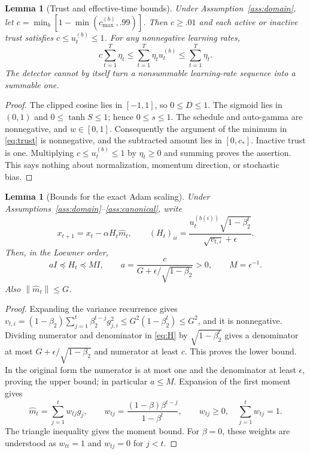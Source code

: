 \documentclass[11pt,a4paper]{article}
\newtheorem{lemma}[theorem]{Lemma}
\theoremstyle{definition}
\theoremstyle{remark}
\newcommand{\norm}[1]{\left\lVert#1\right\rVert}
\begin{document}
\begin{lemma}[Trust and effective-time bounds]\label{lem:trust}
Under Assumption~\ref{ass:domain}, let
$c=\min_b[1-\min(c_{\max}^{(b)},.99)]$. Then $c\ge.01$ and each active
or inactive trust satisfies $c\le u_t^{(b)}\le1$. For any nonnegative
learning rates,
\[
 c\sum_{t=1}^T\eta_t\le\sum_{t=1}^T\eta_t u_t^{(b)}\le\sum_{t=1}^T\eta_t.
\]
The detector cannot by itself turn a nonsummable learning-rate sequence into
a summable one.
\end{lemma}
\begin{proof}
The clipped cosine lies in $[-1,1]$, so $0\le D\le1$.
The sigmoid lies in $(0,1)$ and $0\le\tanh S\le1$; hence $0\le s\le1$.
The schedule and auto-gamma are nonnegative, and $w\in[0,1]$.
Consequently the argument of the minimum in \eqref{eq:trust} is nonnegative,
and the subtracted amount lies in $[0,c_*]$. Inactive trust is one. Multiplying
$c\le u_t^{(b)}\le1$ by $\eta_t\ge0$ and summing proves the assertion.
This says nothing about normalization, momentum direction, or stochastic bias.
\end{proof}

\begin{lemma}[Bounds for the exact Adam scaling]\label{lem:scaling}
Under Assumptions~\ref{ass:domain}--\ref{ass:canonical}, write
\begin{equation}\label{eq:H}
 x_{t+1}=x_t-\alpha H_t\widehat m_t,\qquad
 (H_t)_{ii}=\frac{u_t^{(b(i))}\sqrt{1-\beta_2^t}}{\sqrt{v_{t,i}}+\epsilon}.
\end{equation}
Then, in the Loewner order,
\begin{equation}\label{eq:ab}
 aI\preceq H_t\preceq MI,\qquad
 a=\frac{c}{G+\epsilon/\sqrt{1-\beta_2}}>0,\qquad M=\epsilon^{-1}.
\end{equation}
Also $\norm{\widehat m_t}\le G$.
\end{lemma}
\begin{proof}
Expanding the variance recurrence gives
$v_{t,i}=(1-\beta_2)\sum_{j=1}^t\beta_2^{t-j}g_{j,i}^2\le
G^2(1-\beta_2^t)\le G^2$, and it is nonnegative.
Dividing numerator and denominator in \eqref{eq:H} by
$\sqrt{1-\beta_2^t}$ gives a denominator at most
$G+\epsilon/\sqrt{1-\beta_2}$ and numerator at least $c$. This proves the
lower bound. In the original form the numerator is at most one and the
denominator at least $\epsilon$, proving the upper bound; in particular
$a\le M$.
Expansion of the first moment gives
\begin{equation}\label{eq:weights}
 \widehat m_t=\sum_{j=1}^t w_{tj}g_j,\qquad
 w_{tj}=\frac{(1-\beta)\beta^{t-j}}{1-\beta^t},\qquad
 w_{tj}\ge0,\quad\sum_{j=1}^t w_{tj}=1.
\end{equation}
The triangle inequality gives the moment bound. For $\beta=0$, these weights
are understood as $w_{tt}=1$ and $w_{tj}=0$ for $j<t$.
\end{proof}
\end{document}
